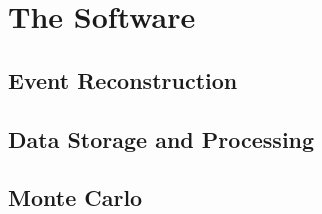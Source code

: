\chapter{The Software}

\section{Event Reconstruction}

\section{Data Storage and Processing}

\section{Monte Carlo}